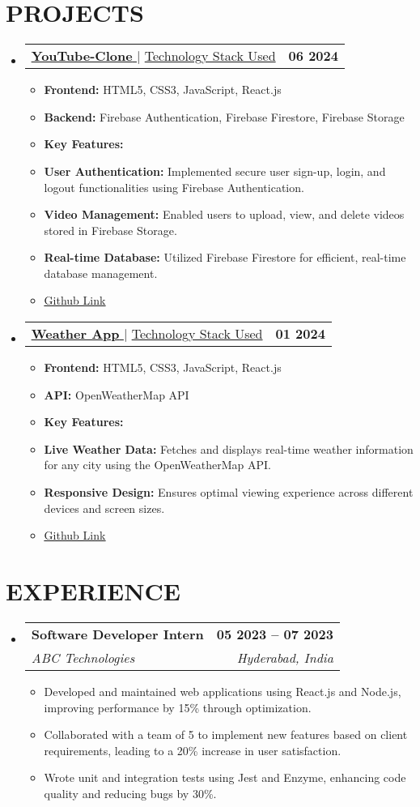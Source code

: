 \documentclass[letterpaper,11pt]{article}
\makeatletter
\newcommand{\resumeItem}[1]{
	\item\small{
		{#1 \vspace{-2pt}}
	}
}
\newcommand{\resumeSubheading}[4]{
	\vspace{-2pt}\item
	\begin{tabular*}{1.0\textwidth}[t]{l@{\extracolsep{\fill}}r}
		\textbf{\large#1} & \textbf{\small #2} \\
		\textit{\large#3} & \textit{\small #4} \\
	\end{tabular*}\vspace{-7pt}
}
\newcommand{\resumeProjectHeading}[2]{
	\item
	\begin{tabular*}{1.001\textwidth}{l@{\extracolsep{\fill}}r}
		\small#1 & \textbf{\small #2}\\
	\end{tabular*}\vspace{-7pt}
}
\newcommand{\resumeSubHeadingListStart}{\begin{itemize}[leftmargin=0.0in, label={}]}
\newcommand{\resumeSubHeadingListEnd}{\end{itemize}}
\newcommand{\resumeItemListStart}{\begin{itemize}}
\newcommand{\resumeItemListEnd}{\end{itemize}\vspace{-5pt}}
\makeatother
\begin{document}
	\section{PROJECTS}
	\vspace{-5pt}
	\resumeSubHeadingListStart
	\resumeProjectHeading
	{\href{https://github.com/Muppukokila/YouTube-clone.git}{\textbf{\large{\underline{YouTube-Clone}}} \href{https://github.com/Muppukokila/YouTube-clone.git}{\raisebox{-0.1\height}\faExternalLink }} $|$ \large{\underline{Technology Stack Used}}}{06 2024}
	\resumeItemListStart
	\resumeItem{\normalsize{\textbf{Frontend:} {HTML5, CSS3, JavaScript, React.js}}}
	\resumeItem{\normalsize{\textbf{Backend:} {Firebase Authentication, Firebase Firestore, Firebase Storage}}}
	\resumeItem{\normalsize{\textbf{Key Features:}}}
	\resumeItem{\textbf{User Authentication:} Implemented secure user sign-up, login, and logout functionalities using Firebase Authentication.}
	\resumeItem{\textbf{Video Management:} Enabled users to upload, view, and delete videos stored in Firebase Storage.}
	\resumeItem{\textbf{Real-time Database:} Utilized Firebase Firestore for efficient, real-time database management.}
	\resumeItem{\textcolor{accent} {\href{https://github.com/Muppukokila/YouTube-clone.git} {\underline{\normalsize{Github Link}}}}}
	\resumeItemListEnd
	\vspace{-10pt}
	
	\resumeProjectHeading
	{\href{https://github.com/Muppukokila/Weather-App.git}{\textbf{\large{\underline{Weather App}}} \href{https://github.com/Muppukokila/Weather-App.git}{\raisebox{-0.1\height}\faExternalLink }} $|$ \large{\underline{Technology Stack Used}}}{01 2024}
	\resumeItemListStart
	\resumeItem{\normalsize{\textbf{Frontend:} {HTML5, CSS3, JavaScript, React.js}}}
	\resumeItem{\normalsize{\textbf{API:} {OpenWeatherMap API}}}
	\resumeItem{\textbf{Key Features:}}
	\resumeItem{\textbf{Live Weather Data:} Fetches and displays real-time weather information for any city using the OpenWeatherMap API.}
	\resumeItem{\textbf{Responsive Design:} Ensures optimal viewing experience across different devices and screen sizes.}
	\resumeItem{\textcolor{accent} {\href{https://github.com/Muppukokila/Weather-App.git} {\underline{\normalsize{Github Link}}}}}
	\resumeItemListEnd
	\resumeSubHeadingListEnd
	\vspace{-10pt}
	
	\section{EXPERIENCE}
	\resumeSubHeadingListStart
	\resumeSubheading
	{Software Developer Intern}{05 2023 -- 07 2023}
	{ABC Technologies}{Hyderabad, India}
	\resumeItemListStart
	\resumeItem{Developed and maintained web applications using React.js and Node.js, improving performance by 15\% through optimization.}
	\resumeItem{Collaborated with a team of 5 to implement new features based on client requirements, leading to a 20\% increase in user satisfaction.}
	\resumeItem{Wrote unit and integration tests using Jest and Enzyme, enhancing code quality and reducing bugs by 30\%.}
	\resumeItemListEnd
	\resumeSubHeadingListEnd
	
\end{document}
